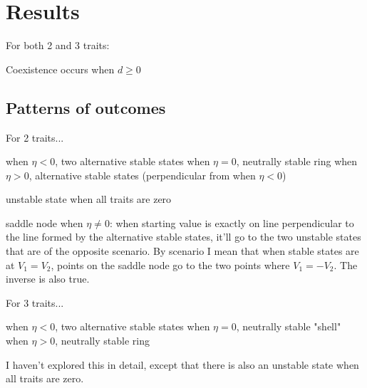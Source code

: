 \section*{Results}



For both 2 and 3 traits:

Coexistence occurs when $d \ge 0$

\subsection*{Patterns of outcomes}

For 2 traits...

when $\eta < 0$, two alternative stable states
when $\eta = 0$, neutrally stable ring
when $\eta > 0$, alternative stable states (perpendicular from
when $\eta < 0$)

unstable state when all traits are zero

saddle node when $\eta \ne 0$:
when starting value is exactly on line perpendicular to
the line formed by the alternative stable states, it'll go to the
two unstable states that are of the opposite scenario.
By scenario I mean that when stable states are at $V_1 = V_2$,
points on the saddle node go to the two points where $V_1 = -V_2$.
The inverse is also true.


For 3 traits...

when $\eta < 0$, two alternative stable states
when $\eta = 0$, neutrally stable "shell"
when $\eta > 0$, neutrally stable ring

I haven't explored this in detail, except that there is also
an unstable state when all traits are zero.
